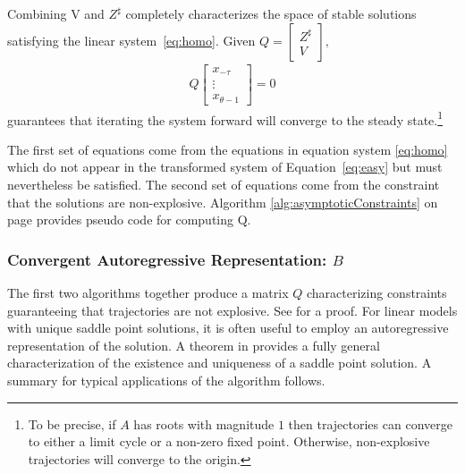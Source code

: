 \documentclass[12pt]{article}
\begin{document}
Combining V and $Z^\sharp$  completely characterizes the space of 
stable solutions satisfying the linear system~\ref{eq:homo}.
Given $  Q= 
  \begin{bmatrix}
    Z^{\sharp}\\V
  \end{bmatrix},
$
\begin{gather}
Q
\begin{bmatrix}
  x_{-\tau} \\ \vdots \\ x_{\theta-1}
\end{bmatrix}=0 
\end{gather}
guarantees that iterating the system forward will converge to the steady 
state.\footnote{
To be precise, if $A$ has roots with magnitude 
$1$ then trajectories can converge to 
either a limit cycle or a non-zero fixed point. Otherwise,
non-explosive trajectories will converge to the origin.}



The first set of equations come from the equations in equation system 
\ref{eq:homo} which do not appear in the transformed system 
of Equation~\ref{eq:easy}
but must nevertheless be satisfied. The second set of equations come from the
constraint that the solutions are non-explosive.
Algorithm \ref{alg:asymptoticConstraints} on page \pageref{alg:asymptoticConstraints} provides pseudo code for computing Q.
  




\subsubsection{Convergent Autoregressive Representation: $B$}
\label{conar}

The first two algorithms  together  produce a matrix $Q$ characterizing
constraints guaranteeing that trajectories are not explosive.  See \cite{anderson10}  for a proof.
For linear models with unique  saddle point
solutions, it is often useful to 
employ an autoregressive representation of the solution.
A theorem in \cite{anderson10} 
provides a fully general characterization
of the existence and uniqueness of
a saddle point solution.  
  A summary for typical applications of the algorithm follows.
\end{document}
